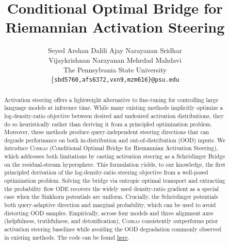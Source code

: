 \documentclass[a4paper,10pt]{article}
\title{Conditional Optimal Bridge for Riemannian Activation Steering}
\author{Seyed Arshan Dalili \qquad Ajay Narayanan Sridhar \vspace*{.0em} \\
        Vijaykrishnan Narayanan \qquad Mehrdad Mahdavi \vspace*{.5em} \\
        \quad The Pennsylvania State University\vspace*{.2em} \\  \{\texttt{sbd5760,afs6372,vxn9,mzm616\}@psu.edu}}
\date{}
\theoremstyle{plain}
\begin{document}
\maketitle


\begin{abstract}
Activation steering offers a lightweight alternative to fine-tuning for controlling large language models at inference time. While many existing methods implicitly optimize a log-density-ratio objective between desired and undesired activation distributions, they do so heuristically rather than deriving it from a principled optimization problem. Moreover, these methods produce query-independent steering directions that can degrade performance on both in-distribution and out-of-distribution (OOD) inputs. We introduce \textsc{Cobras} (Conditional Optimal Bridge for Riemannian Activation Steering), which addresses both limitations by casting activation steering as a Schr\"{o}dinger Bridge on the residual-stream hypersphere. This formulation yields, to our knowledge, the first principled derivation of the log-density-ratio steering objective from a well-posed optimization problem. Solving the bridge via entropic optimal transport and extracting the probability flow ODE recovers the widely used density-ratio gradient as a special case when the Sinkhorn potentials are uniform. Crucially, the Schr\"{o}dinger potentials both query-adaptive direction and marginal probability, which can be used to avoid distorting OOD samples. Empirically, across four models and three alignment axes (helpfulness, truthfulness, and detoxification), \textsc{Cobras} consistently outperforms prior activation steering baselines while avoiding the OOD degradation commonly observed in existing methods. The code can be found \href{https://github.com/arshandalili/cobras}{here}.
\end{abstract}


\bigskip













\clearpage
\appendix



% 
\end{document}
